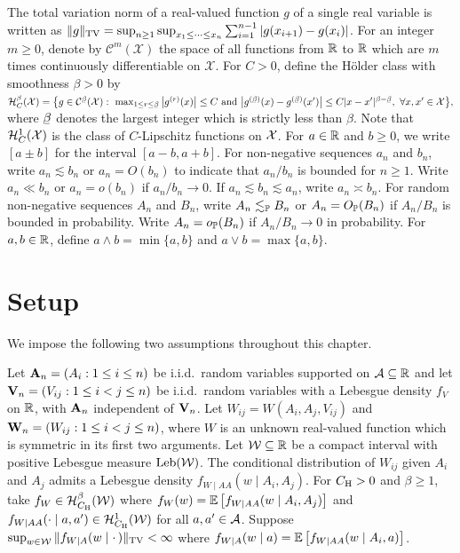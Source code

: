 The total variation norm of a
real-valued function $g$ of a single real variable is written as
$\|g\|_\TV = \sup_{n \geq 1} \sup_{x_1 \leq \cdots \leq x_n}
\sum_{i=1}^{n-1} |g(x_{i+1}) - g(x_i)|$.
For an integer $m\geq 0$, denote by $\mathcal{C}^m(\mathcal{X})$
the space of all functions from $\R$ to $\R$
which are $m$ times continuously differentiable on $\mathcal{X}$.
For $C>0$, define the H\"{o}lder class with smoothness $\beta > 0$ by
$\cH^\beta_C(\cX) =
\big\{
  g \in \cC^{\flbeta}(\cX): \
  \max_{1 \leq r \leq \flbeta}
  \big| g^{(r)}(x) \big| \leq C
  \text{ and }
  \big| g^{(\flbeta)}(x) - g^{(\flbeta)}(x') \big|
  \leq C |x-x'|^{\beta - \flbeta}, \
  \forall x, x' \in \cX
\big\},
$
where $\flbeta$ denotes the largest integer which is strictly less than $\beta$.
Note that $\cH^1_C(\cX)$ is the class of $C$-Lipschitz functions on $\cX$.
For $a \in \R$ and $b \geq 0$, we write $[a \pm b]$ for the interval
$[a-b, a+b]$. For non-negative sequences $a_n$ and $b_n$, write
$a_n \lesssim b_n$ or $a_n = O(b_n)$ to indicate that
$a_n / b_n$ is bounded for $n\geq 1$.
Write $a_n \ll b_n$ or $a_n = o(b_n)$ if $a_n / b_n \to 0$.
If $a_n \lesssim b_n \lesssim a_n$, write $a_n \asymp b_n$.
For random non-negative sequences $A_n$ and $B_n$, write
$A_n \lesssim_\P B_n$ or $A_n = O_\P(B_n)$ if
$A_n / B_n$ is bounded in probability.
Write $A_n = o_\P(B_n)$ if $A_n / B_n \to 0$ in probability.
For $a,b \in \R$, define $a\wedge b=\min\{a,b\}$ and $a \vee b = \max\{a,b\}$.

\section{Setup}\label{sec:kernel_setup}

We impose the following two assumptions throughout this chapter.
%
\begin{assumption}[Data generation]\label{ass:kernel_data}
  Let $\bA_n = (A_i: 1 \leq i \leq n)$ be i.i.d.\ random variables supported on
  $\cA \subseteq \R$ and let $\bV_n = (V_{i j}: 1 \leq i < j \leq n)$ be
  i.i.d.\ random variables with a Lebesgue density $f_V$ on $\R$, with $\bA_n$
  independent of $\bV_n$.
  Let $W_{i j} = W(A_i, A_j, V_{i j})$ and
  $\bW_n = (W_{i j}: 1 \leq i < j \leq n)$, where $W$ is an unknown real-valued
  function which is symmetric in its first two arguments.
  Let $\cW \subseteq \R$ be a compact interval with positive Lebesgue measure
  $\Leb(\cW)$. The conditional distribution of $W_{i j}$ given $A_i$ and $A_j$
  admits a Lebesgue density $f_{W \mid AA}(w \mid A_i, A_j)$.
  For $C_\rH > 0$ and $\beta \geq 1$, take $f_W \in \cH^\beta_{C_\rH}(\cW)$
  where $f_{W}(w) = \E\left[f_{W \mid AA}(w \mid A_i,A_j)\right]$ and
  $f_{W \mid AA}(\cdot \mid a, a') \in \cH^1_{C_\rH}(\cW)$
  for all $a,a' \in \cA$. Suppose
  $\sup_{w \in \cW} \|f_{W \mid A}(w \mid \cdot\,)\|_\TV <\infty$ where
  $f_{W \mid A}(w \mid a) = \E\left[f_{W \mid AA}(w \mid A_i,a)\right]$.
\end{assumption}

